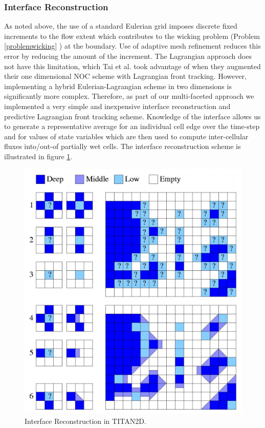 \documentclass[review]{elsarticle}
\begin{document}
\subsubsection{Interface Reconstruction} \label{Interfacerecon}
As noted above, the use of a standard Eulerian grid imposes discrete 
fixed increments to the flow extent which contributes to the wicking problem
(Problem \ref{problemwicking} ) at the 
boundary.  Use of adaptive mesh refinement 
reduces this error by reducing the amount of the increment. 
The Lagrangian approach does not have this 
limitation, which Tai et al. \cite{Tai2002} took advantage
of when they augmented their one dimensional NOC scheme with 
Lagrangian front tracking.  However, implementing a hybrid 
Eulerian-Lagrangian scheme in two dimensions is significantly more 
complex. 
Therefore, as part of our multi-faceted approach we implemented a very 
simple and inexpensive interface reconstruction and predictive 
Lagrangian front tracking scheme.  Knowledge of the interface allows
us to generate a representative average for an individual cell edge 
over the time-step and for values of state variables which are then used to 
compute inter-cellular fluxes into/out-of partially wet cells.  The 
interface reconstruction scheme is illustrated in figure \ref{interface}.
\begin{figure}[!h]
        \centerline{\includegraphics[scale=0.3]{IMAGES/flux.png}}
        \caption{Interface Reconstruction in TITAN2D.}
        \label{interface}
\end{figure} 
\end{document}
